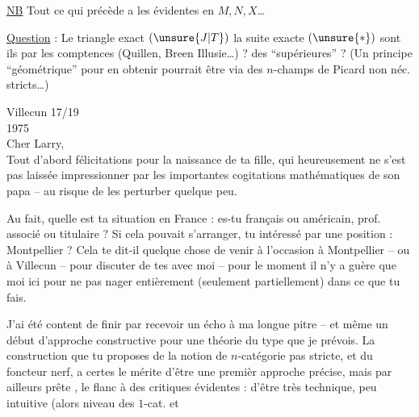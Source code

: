 \uline{NB} Tout ce qui précède a les  évidentes en $M,N,X$\ldots

\uline{Question} : Le triangle exact $(\unsure{J|T})$  la suite exacte $(\unsure{*})$ sont ils  par les comptences (Quillen, Breen Illusie\ldots) ?  des  ``supérieures'' ? (Un principe ``géométrique'' pour en obtenir pourrait être via des $n$-champs de Picard non néc. stricts\ldots)


\hfill Villecun 17/19 \\
\hfill 1975\\
Cher Larry,\\

Tout d'abord félicitations pour la naissance de ta fille, qui heureusement ne s'est pas laissée impressionner par les importantes cogitations mathématiques de son papa -- au risque de les perturber quelque peu.

Au fait, quelle est ta situation en France : es-tu français ou américain, prof. associé ou titulaire ? Si cela pouvait s'arranger,  tu intéressé par une position : Montpellier ? Cela te dit-il quelque chose de venir à l'occasion à Montpellier -- ou à Villecun -- pour discuter de tes  avec moi -- pour le moment il n'y a guère que moi ici pour ne pas nager entièrement (seulement partiellement) dans ce que tu fais.

J'ai été content de finir par recevoir un écho à ma longue pitre -- et même un début d'approche constructive pour  une théorie du type que je prévois. La construction que tu proposes de la notion de $n$-catégorie pas stricte, et du foncteur nerf, a certes le mérite  d'être une premièr approche précise, mais par ailleurs prête  , le flanc à des critiques évidentes : d'être très technique, peu intuitive (alors  niveau des $1$-cat. et

